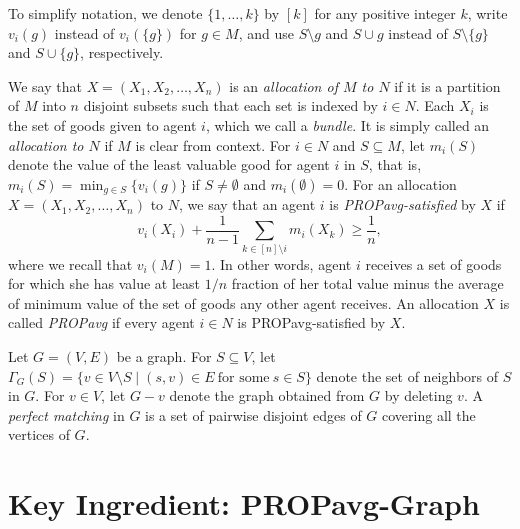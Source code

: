 \documentclass[11pt]{article}
\newcommand{\PROPavg}{\textsf{PROPavg}\xspace}
\begin{document}
To simplify notation, we denote $\{1,\ldots, k\}$ by $[k]$  for any positive integer $k$, write $v_i(g)$ instead of $v_i(\{g\})$ for $g\in M$, and use $S\setminus g$ and $S\cup g$ instead of $S\setminus \{g\}$ and  $S\cup \{g\}$, respectively.

We say that $X=(X_1,X_2,\ldots, X_n)$ is an {\it allocation of $M$ to $N$} if it is a partition of $M$ into $n$ disjoint subsets such that each set is indexed by $i \in N$. Each $X_i$ is the set of goods given to agent $i$, which we call a {\it bundle}. 
It is simply called an {\em allocation to $N$} if $M$ is clear from context. 
For $i\in N$ and $S \subseteq M$, let $m_i(S)$ denote the value of the least valuable good for agent $i$ in $S$, that is, 
$m_i(S)= \min_{g\in S} \{v_i(g)\}$ if $S \neq \emptyset$ and $m_i(\emptyset)=0$.  
For an allocation $X=(X_1,X_2,\ldots, X_n)$ to $N$, we say that an agent $i$ is {\it \PROPavg-satisfied} by $X$ if 
$$
v_i(X_i) +\frac{1}{n-1}\sum_{k\in [n]\setminus i} m_i(X_k) \ge \frac{1}{n}, 
$$
where we recall that $v_i(M)=1$.
In other words, agent $i$ receives a set of goods for which she has value at least $1/n$ fraction of her total value 
minus the average of minimum value of the set of goods any other agent receives.
An allocation $X$ is called {\it \PROPavg} if every agent  $i \in N$ is \PROPavg-satisfied by $X$.

Let  $G=(V, E)$ be a graph. For $S\subseteq V$, let $\Gamma_{G}(S)=\{v\in V\setminus S \mid (s,v)\in E~\text{for some}~s\in S\}$ denote the set of neighbors of $S$ in $G$.
For $v\in V$, let $G-v$ denote the graph obtained from $G$ by deleting $v$.
A {\it perfect matching} in $G$ is a set of pairwise disjoint edges of $G$ covering all the vertices of $G$.



\section{Key Ingredient: \PROPavg-Graph}
\label{sec:propavggraph}
\end{document}
